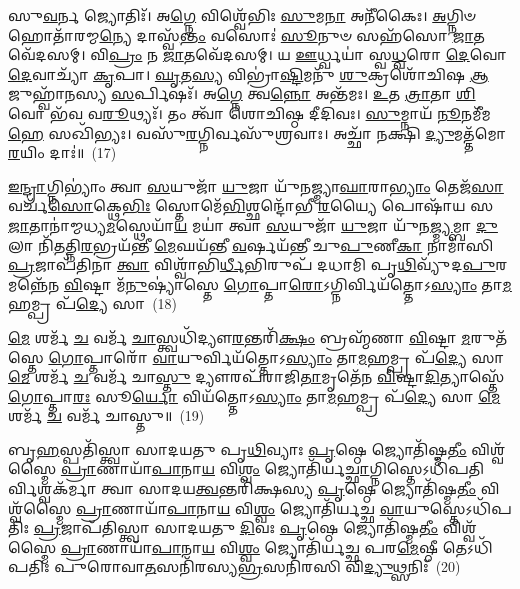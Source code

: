 𑌸𑍁\-\ul{𑌵}\-𑌰𑍍𑌨 𑌜𑍍𑌯𑍋𑌤𑌿𑌃᳴। 𑌅\-\ul{𑌗𑍍𑌨𑍇} 𑌵𑌿𑌶𑍍𑌵𑍇᳴𑌭𑌿𑌃 \ul{𑌸𑍁}\-𑌮\-\ul{𑌨𑌾} 𑌅𑌨𑍀᳴𑌕𑍈𑌃। \ul{𑌅}\-𑌗𑍍𑌨𑌿𑍞 𑌹𑍋𑌤𑌾᳴𑌰𑌮𑍍𑌮\-\ul{𑌨𑍍𑌯𑍇} 𑌦𑌾𑌸𑍍𑌵᳴\-\ul{𑌨𑍍𑌤𑌂} 𑌵𑌸𑍋𑌃॑ \ul{𑌸𑍂}\-𑌨𑍁𑍞 𑌸𑌹᳴𑌸𑍋 \ul{𑌜𑌾}\-𑌤𑌵𑍇᳴𑌦𑌸𑌮𑍍। 𑌵𑌿\-\ul{𑌪𑍍𑌰𑌂} 𑌨 \ul{𑌜𑌾}\-𑌤𑌵𑍇᳴𑌦𑌸𑌮𑍍। 𑌯 \ul{𑌊}\-𑌰𑍍𑌧𑍍𑌵𑌯𑌾॑ 𑌸𑍍𑌵\-\ul{𑌧𑍍𑌵}\-𑌰𑍋 \ul{𑌦𑍇}\-𑌵𑍋 \ul{𑌦𑍇}\-𑌵𑌾𑌚𑍍𑌯𑌾᳴ \ul{𑌕𑍃}\-𑌪𑌾। \ul{𑌘𑍃}\-𑌤\-\ul{𑌸𑍍𑌯} 𑌵𑌿𑌭𑍍𑌰𑌾॑\-\ul{𑌷𑍍𑌟𑌿}\-𑌮𑌨𑍁᳴ \ul{𑌶𑍁}\-𑌕𑍍𑌰𑌶𑍋᳴𑌚𑌿𑌷 \ul{𑌆}\-𑌜𑍁𑌹𑍍𑌵𑌾᳴𑌨𑌸𑍍𑌯 \ul{𑌸}\-𑌰𑍍𑌪𑌿𑌷𑌃᳴। 𑌅\-\ul{𑌗𑍍𑌨𑍇} 𑌤𑍍𑌵\-\ul{𑌨𑍍𑌨𑍋} 𑌅𑌨𑍍𑌤᳴𑌮𑌃। \ul{𑌉}\-𑌤 \ul{𑌤𑍍𑌰𑌾}\-𑌤𑌾 \ul{𑌶𑌿}\-𑌵𑍋 𑌭᳴𑌵 𑌵\-\ul{𑌰𑍂}\-𑌥𑍍𑌯𑌃᳴। 𑌤𑌂 𑌤𑍍𑌵𑌾᳴ 𑌶𑍋𑌚𑌿𑌷𑍍𑌠 𑌦𑍀𑌦𑌿𑌵𑌃। \ul{𑌸𑍁}\-𑌮𑍍𑌨𑌾𑌯᳴ \ul{𑌨𑍂}\-𑌨𑌮𑍀᳴𑌮\-\ul{𑌹𑍇} 𑌸𑌖𑌿᳴𑌭𑍍𑌯𑌃। 𑌵𑌸𑍁᳴\-\ul{𑌰}\-𑌗𑍍𑌨𑌿𑌰𑍍𑌵𑌸𑍁᳴𑌶𑍍𑌰𑌵𑌾𑌃। 𑌅𑌚𑍍𑌛𑌾᳴ 𑌨𑌕𑍍𑌷𑌿 \ul{𑌦𑍍𑌯𑍁}\-𑌮𑌤𑍍𑌤᳴𑌮𑍋 \ul{𑌰}\-𑌯𑌿𑌂 𑌦𑌾𑌃॑॥~(17)

{}%

\-\ul{𑌇}\-\-\ul{𑌨𑍍𑌦𑍍𑌰𑌾}\-𑌗𑍍𑌨𑌿\-𑌭𑍍𑌯𑌾𑌂॑ 𑌤𑍍𑌵𑌾 \ul{𑌸}\-𑌯𑍁𑌜𑌾᳴ \ul{𑌯𑍁}\-𑌜𑌾 𑌯𑍁᳴𑌨𑌜𑍍𑌮𑍍𑌯𑌾\-\ul{𑌘𑌾}\-𑌰𑌾\-\ul{𑌭𑍍𑌯𑌾𑌂} 𑌤𑍇𑌜᳴\-\ul{𑌸𑌾} 𑌵𑌰𑍍𑌚᳴\-\ul{𑌸𑍋}\-𑌕𑍍𑌥𑍇\-\ul{𑌭𑌿𑌃} 𑌸𑍍𑌤𑍋𑌮𑍇᳴\-\ul{𑌭𑌿}\-𑌶𑍍𑌛𑌨𑍍𑌦𑍋᳴𑌭𑍀 \ul{𑌰}\-𑌯𑍍𑌯𑍈 𑌪𑍋𑌷𑌾᳴𑌯 𑌸\-\ul{𑌜𑌾}\-𑌤𑌾𑌨𑌾॑𑌮𑍍𑌮𑌧𑍍𑌯\-\ul{𑌮}\-𑌸𑍍𑌥𑍇𑌯𑌾᳴\-\ul{𑌯} 𑌮𑌯𑌾॑ 𑌤𑍍𑌵𑌾 \ul{𑌸}\-𑌯𑍁𑌜𑌾᳴ \ul{𑌯𑍁}\-𑌜𑌾 𑌯𑍁᳴𑌨\-\ul{𑌜𑍍𑌮𑍍𑌯}\-𑌮𑍍𑌬𑌾 \ul{𑌦𑍁}\-𑌲𑌾 𑌨𑌿᳴\-\ul{𑌤}\-𑌤𑍍𑌨𑌿\-\ul{𑌰}\-𑌭𑍍𑌰𑌯᳴𑌨𑍍𑌤𑍀 \ul{𑌮𑍇}\-𑌘𑌯᳴𑌨𑍍𑌤𑍀 \ul{𑌵}\-𑌰𑍍\mbox{}𑌷𑌯᳴𑌨𑍍𑌤𑍀 𑌚𑍁\-\ul{𑌪𑍁}\-𑌣𑍀\-\ul{𑌕𑌾} 𑌨𑌾𑌮𑌾᳴𑌸𑌿 \ul{𑌪𑍍𑌰}\-𑌜𑌾𑌪᳴𑌤𑌿𑌨𑌾 \ul{𑌤𑍍𑌵𑌾} 𑌵𑌿𑌶𑍍𑌵𑌾᳴𑌭𑌿\-\ul{𑌰𑍍𑌧𑍀}\-𑌭𑌿𑌰𑍁𑌪᳴ 𑌦𑌧𑌾𑌮𑌿 𑌪𑍃\-\ul{𑌥𑌿}\-𑌵𑍍𑌯𑍁᳴𑌦\-\ul{𑌪𑍁}\-𑌰𑌮𑌨𑍍𑌨𑍇᳴𑌨 \ul{𑌵𑌿}\-𑌷𑍍𑌟𑌾 𑌮᳴\-\ul{𑌨𑍁}\-𑌷𑍍𑌯𑌾॑𑌸𑍍𑌤𑍇 \ul{𑌗𑍋}\-𑌪𑍍𑌤𑌾\-\ul{𑌰𑍋}\-\-𑌽𑌗𑍍𑌨𑌿𑌰𑍍𑌵𑌿𑌯᳴𑌤𑍍𑌤𑍋\-𑌽\-\ul{𑌸𑍍𑌯𑌾𑌂} 𑌤𑌾\-\ul{𑌮}\-𑌹𑌮𑍍𑌪𑍍𑌰 𑌪᳴\-\ul{𑌦𑍍𑌯𑍇} 𑌸𑌾~(18)

\-\ul{𑌮𑍇} 𑌶𑌰𑍍𑌮᳴ \ul{𑌚} 𑌵𑌰𑍍𑌮᳴ \ul{𑌚𑌾}\-𑌸𑍍𑌤𑍍𑌵𑌧𑌿᳴𑌦𑍍𑌯𑍗\-\ul{𑌰}\-𑌨𑍍𑌤𑌰𑌿᳴\-\ul{𑌕𑍍𑌷𑌂} 𑌬𑍍𑌰𑌹𑍍𑌮᳴𑌣𑌾 \ul{𑌵𑌿}\-𑌷𑍍𑌟𑌾 \ul{𑌮}\-𑌰𑍁𑌤᳴𑌸𑍍𑌤𑍇 \ul{𑌗𑍋}\-𑌪𑍍𑌤𑌾𑌰𑍋᳴ \ul{𑌵𑌾}\-𑌯𑍁𑌰𑍍𑌵𑌿𑌯᳴𑌤𑍍𑌤𑍋\-𑌽\-\ul{𑌸𑍍𑌯𑌾𑌂} 𑌤𑌾\-\ul{𑌮}\-𑌹𑌮𑍍𑌪𑍍𑌰 𑌪᳴\-\ul{𑌦𑍍𑌯𑍇} 𑌸𑌾 \ul{𑌮𑍇} 𑌶𑌰𑍍𑌮᳴ \ul{𑌚} 𑌵𑌰𑍍𑌮᳴ 𑌚𑌾\-\ul{𑌸𑍍𑌤𑍁} 𑌦𑍍𑌯𑍗𑌰𑌪᳴𑌰𑌾𑌜𑌿\-\ul{𑌤𑌾}\-𑌮𑍃𑌤𑍇᳴𑌨 \ul{𑌵𑌿}\-𑌷𑍍𑌟𑌾\-\ul{𑌦𑌿}\-𑌤𑍍𑌯𑌾𑌸𑍍𑌤𑍇᳴ \ul{𑌗𑍋}\-𑌪𑍍𑌤𑌾\-\ul{𑌰𑌃} 𑌸𑍂\-\ul{𑌰𑍍𑌯𑍋} 𑌵𑌿𑌯᳴𑌤𑍍𑌤𑍋\-𑌽\-\ul{𑌸𑍍𑌯𑌾𑌂} 𑌤𑌾\-\ul{𑌮}\-𑌹𑌮𑍍𑌪𑍍𑌰 𑌪᳴\-\ul{𑌦𑍍𑌯𑍇} 𑌸𑌾 \ul{𑌮𑍇} 𑌶𑌰𑍍𑌮᳴ \ul{𑌚} 𑌵𑌰𑍍𑌮᳴ 𑌚𑌾𑌸𑍍𑌤𑍁॥~(19)

{\anuvakamend[{𑌸𑌾\-𑌽𑌷𑍍𑌟𑌾𑌚᳴𑌤𑍍𑌵𑌾𑌰𑌿𑍞𑌶𑌚𑍍𑌚}]}%

𑌬𑍃\-\ul{𑌹}\-𑌸𑍍𑌪𑌤𑌿᳴𑌸𑍍𑌤𑍍𑌵𑌾 𑌸𑌾𑌦𑌯𑌤𑍁 𑌪𑍃\-\ul{𑌥𑌿}\-𑌵𑍍𑌯𑌾𑌃 \ul{𑌪𑍃}\-𑌷𑍍𑌠𑍇 𑌜𑍍𑌯𑍋𑌤𑌿᳴𑌷𑍍𑌮\-\ul{𑌤𑍀𑌂} 𑌵𑌿𑌶𑍍𑌵᳴𑌸𑍍𑌮𑍈 \ul{𑌪𑍍𑌰𑌾}\-𑌣𑌾𑌯𑌾᳴\-\ul{𑌪𑌾}\-𑌨𑌾\-\ul{𑌯} 𑌵𑌿\-\ul{𑌶𑍍𑌵𑌂} 𑌜𑍍𑌯𑍋𑌤𑌿᳴𑌰𑍍𑌯\-\ul{𑌚𑍍𑌛𑌾}\-𑌗𑍍𑌨𑌿𑌸𑍍𑌤𑍇\-𑌽𑌧𑌿᳴𑌪𑌤𑌿𑌰𑍍\-\-\ul{𑌵𑌿}\-𑌶𑍍𑌵𑌕᳴𑌰𑍍𑌮𑌾 𑌤𑍍𑌵𑌾 𑌸𑌾𑌦𑌯\-\ul{𑌤𑍍𑌵}\-𑌨𑍍𑌤𑌰𑌿᳴𑌕𑍍𑌷𑌸𑍍𑌯 \ul{𑌪𑍃}\-𑌷𑍍𑌠𑍇 𑌜𑍍𑌯𑍋𑌤𑌿᳴𑌷𑍍𑌮\-\ul{𑌤𑍀𑌂} 𑌵𑌿𑌶𑍍𑌵᳴𑌸𑍍𑌮𑍈 \ul{𑌪𑍍𑌰𑌾}\-𑌣𑌾𑌯𑌾᳴\-\ul{𑌪𑌾}\-𑌨𑌾\-\ul{𑌯} 𑌵𑌿\-\ul{𑌶𑍍𑌵𑌂} 𑌜𑍍𑌯𑍋𑌤𑌿᳴𑌰𑍍𑌯𑌚𑍍𑌛 \ul{𑌵𑌾}\-𑌯𑍁𑌸𑍍𑌤𑍇\-𑌽𑌧𑌿᳴𑌪𑌤𑌿𑌃 \ul{𑌪𑍍𑌰}\-𑌜𑌾𑌪᳴𑌤𑌿𑌸𑍍𑌤𑍍𑌵𑌾 𑌸𑌾𑌦𑌯𑌤𑍁 \ul{𑌦𑌿}\-𑌵𑌃 \ul{𑌪𑍃}\-𑌷𑍍𑌠𑍇 𑌜𑍍𑌯𑍋𑌤𑌿᳴𑌷𑍍𑌮\-\ul{𑌤𑍀𑌂} 𑌵𑌿𑌶𑍍𑌵᳴𑌸𑍍𑌮𑍈 \ul{𑌪𑍍𑌰𑌾}\-𑌣𑌾𑌯𑌾᳴\-\ul{𑌪𑌾}\-𑌨𑌾\-\ul{𑌯} 𑌵𑌿\-\ul{𑌶𑍍𑌵𑌂} 𑌜𑍍𑌯𑍋𑌤𑌿᳴𑌰𑍍𑌯𑌚𑍍𑌛 𑌪𑌰\-\ul{𑌮𑍇}\-𑌷𑍍𑌠𑍀 𑌤𑍇\-𑌽𑌧𑌿᳴𑌪𑌤𑌿𑌃 𑌪𑍁𑌰𑍋𑌵𑌾\-\ul{𑌤}\-𑌸𑌨𑌿᳴𑌰𑌸𑍍𑌯\-\ul{𑌭𑍍𑌰}\-𑌸𑌨𑌿᳴𑌰𑌸𑌿 𑌵𑌿\-\ul{𑌦𑍍𑌯𑍁}\-𑌥𑍍𑌸𑌨𑌿𑌃᳴~(20)

